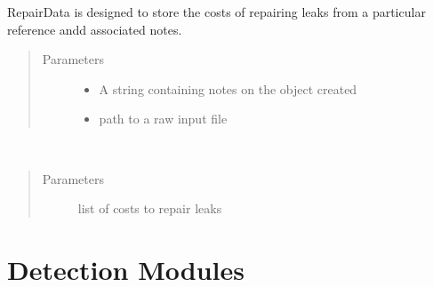 \documentclass[letterpaper,10pt,english]{sphinxmanual}
\begin{document}

\begin{fulllineitems}
\label{\detokenize{index:feast.input_data_classes.RepairData}}
RepairData is designed to store the costs of repairing leaks from a particular reference andd associated notes.
\begin{quote}\begin{description}
\item[{Parameters}] \leavevmode\begin{itemize}
\item {} 
 \textendash{} A string containing notes on the object created

\item {} 
 \textendash{} path to a raw input file

\end{itemize}

\end{description}\end{quote}

\begin{fulllineitems}
\label{\detokenize{index:feast.input_data_classes.RepairData.define_data}}~\begin{quote}\begin{description}
\item[{Parameters}] \leavevmode
{} \textendash{} list of costs to repair leaks

\end{description}\end{quote}

\end{fulllineitems}


\end{fulllineitems}



\section{Detection Modules}
\label{\detokenize{index:detection-modules}}
\end{document}

